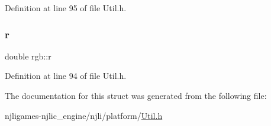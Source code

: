 Definition at line 95 of file Util.\+h.

\mbox{\label{structrgb_ad5a38e43f70fb57d6da052745ea5ff90}} 
\subsubsection{\texorpdfstring{r}{r}}
{\footnotesize\ttfamily double rgb\+::r}



Definition at line 94 of file Util.\+h.



The documentation for this struct was generated from the following file\+:\begin{DoxyCompactItemize}
\item 
njligames-\/njlic\+\_\+engine/njli/platform/\mbox{\hyperlink{_util_8h}{Util.\+h}}\end{DoxyCompactItemize}
